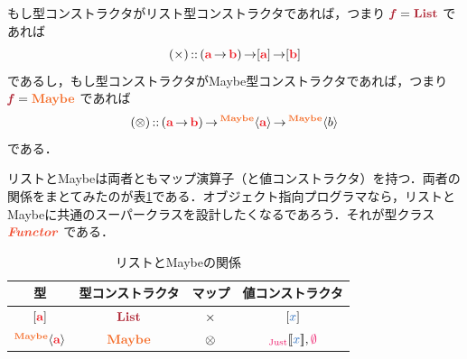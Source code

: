 \documentclass[a5paper,twoside,fleqn,draft]{jsbook}
\begin{document}
もし型コンストラクタがリスト型コンストラクタであれば，つまり $\mTypeConstructor{f}=\mListTypeConstructor$ であれば
\begin{equation}
  (\hMap)
  \hIsTypeOf{}(\hTypeName{a}\hFunctionArrow\hTypeName{b})\hFunctionArrow\hListConstruct{\hTypeName{a}}\hFunctionArrow[\hTypeName{b}]
\end{equation}
であるし，もし型コンストラクタがMaybe型コンストラクタであれば，つまり
$\mTypeConstructor{f}=\hMaybe$ であれば
\begin{equation}
  (\hMaybeMap)
  \hIsTypeOf{}(\hTypeName{a}\hFunctionArrow\hTypeName{b})\hFunctionArrow\hMaybeConstruct{\hTypeName{a}}\hFunctionArrow\hMaybeConstruct{b}
\end{equation}
である．

リストとMaybeは両者ともマップ演算子（と値コンストラクタ）を持つ．両者の関係をまとてみたのが表\ref{tab:list-and-maybe}である．オブジェクト指向プログラマなら，リストとMaybeに共通のスーパークラスを設計したくなるであろう．それが型クラス $\mFunctorTypeClass$ である．

\begin{table}
\label{tab:list-and-maybe}
\caption{リストとMaybeの関係}
\begin{center}
\begin{tabular}{||c|c|c|c||}\hline
型&型コンストラクタ&マップ&値コンストラクタ\\\hline\hline
$\hListConstruct{\hTypeName{a}}$&$\mListTypeConstructor$&$\operatorname{\times}$&$[\hVar{x}]$\\
$\hMaybeConstruct{\hTypeName{a}}$&$\hMaybe$&$\operatorname{\otimes}$&$\hJustWith{\hVar{x}},\hNothing$\\\hline
\end{tabular}
\end{center}
\end{table}



\end{document}
